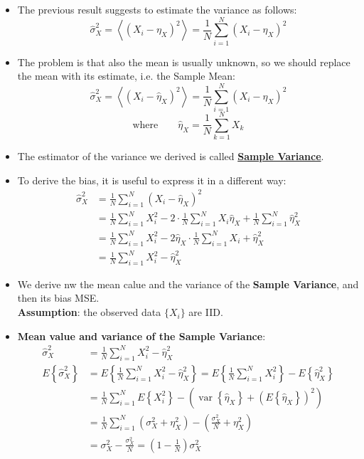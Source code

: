 \begin{itemize}
\[
\left\langle g(X_i) \right\rangle = \frac{1}{N} \sum_{i=1}^N g(X_i) \xrightarrow{N \to \infty} E\left\{ g(X_i) \right\}, \quad \text{if} \quad \mathrm{var}\left\{ g(X_i) \right\} < +\infty
\]
In the case we want to estimate the \textbf{variance} :
\[
\sigma_X^2 = E\left\{(X - \eta_X)^2\right\}
\implies
S \triangleq g(X) = (X - \eta_X)^2
\]
\item The previous result suggests to estimate the variance as follows:
\[
\hat{\sigma}_X^2 = \left\langle (X_i - \eta_X)^2 \right\rangle = \frac{1}{N} \sum_{i=1}^N (X_i - \eta_X)^2
\]
\item The problem is that also the mean is usually unknown, so we should replace the mean with its estimate, i.e. the Sample Mean:
\[
\hat{\sigma}_X^2 = \left\langle (X_i - \hat{\eta}_X)^2 \right\rangle
= \frac{1}{N} \sum_{i=1}^N (X_i - \hat{\eta}_X)^2
\]
\[
\text{where} \qquad \hat{\eta}_X = \frac{1}{N} \sum_{k=1}^{N} X_k
\]

\item The estimator of the variance we derived is called \underline{\textbf{Sample Variance}}.
\item To derive the bias, it is useful to express it in a different way:
\[
\begin{aligned}
\hat{\sigma}_X^2 &= \frac{1}{N} \sum_{i=1}^N (X_i - \hat{\eta}_X)^2 \\
&= \frac{1}{N} \sum_{i=1}^N X_i^2 - 2 \cdot \frac{1}{N} \sum_{i=1}^N X_i \hat{\eta}_X + \frac{1}{N} \sum_{i=1}^N \hat{\eta}_X^2 \\
&= \frac{1}{N} \sum_{i=1}^N X_i^2 - 2 \hat{\eta}_X \cdot \frac{1}{N} \sum_{i=1}^N X_i + \hat{\eta}_X^2 \\
&= \frac{1}{N} \sum_{i=1}^N X_i^2 - \hat{\eta}_X^2
\end{aligned}
\]

\item We derive nw the mean calue and the variance of the \textbf{Sample Variance}, and then its bias MSE.\\
\textbf{Assumption}: the observed data \(\{X_i\}\) are IID.
\item \textbf{Mean value and variance of the Sample Variance}:
\[
\begin{aligned}
\hat{\sigma}_X^2 &= \frac{1}{N} \sum_{i=1}^{N} X_i^2 - \hat{\eta}_X^2 \\[1.5ex]
E \left\{ \hat{\sigma}_X^2 \right\} &= E \left\{ \frac{1}{N} \sum_{i=1}^N X_i^2 - \hat{\eta}_X^2 \right\}
= E \left\{ \frac{1}{N} \sum_{i=1}^N X_i^2 \right\} - E \left\{ \hat{\eta}_X^2 \right\} \\[1.5ex]
&= \frac{1}{N} \sum_{i=1}^N E \left\{ X_i^2 \right\}
- \left( \operatorname{var}\left\{ \hat{\eta}_X \right\} + \left( E \left\{ \hat{\eta}_X \right\} \right)^2 \right) \\[1.5ex]
&= \frac{1}{N} \sum_{i=1}^N \left( \sigma_X^2 + \eta_X^2 \right)
- \left( \frac{\sigma_X^2}{N} + \eta_X^2 \right) \\[1.5ex]
&= \sigma_X^2 - \frac{\sigma_X^2}{N}
= \left(1-\frac{1}{N}\right) \sigma_X^2
\end{aligned}
\]


\end{itemize}
